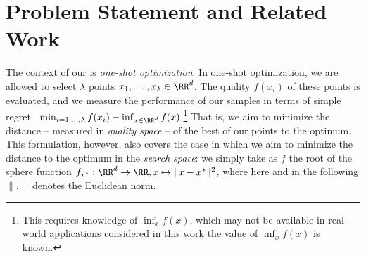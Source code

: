\section{Problem Statement and Related Work}\label{statement}
\label{sec:basics}
The context of our  is \textit{one-shot optimization}. In one-shot optimization, we are allowed to select $\lambda$ points $x_1, \ldots, x_{\lambda} \in \RR^d$. The quality $f(x_i)$ of these points is evaluated, and we measure the performance of our samples in terms of simple regret~\cite{bubeck2009pure} 
$\min_{i=1, \ldots,\lambda}f(x_i)-\inf_{x \in \RR^d} f(x)$.\footnote{This requires knowledge of $\inf_{x} f(x)$, which may not be available in real-world  applications considered in this work the value of $\inf_x f(x)$ is known.} That is, we aim to minimize the distance -- measured in \textit{quality space} -- of the best of our points to the optimum. This formulation, however, also covers the case in which we aim to minimize the distance to the optimum in the \textit{search space}: we simply take as $f$ the root of the sphere function $f_{x^*}: \RR^d \to \RR, x \mapsto \lVert x - x^*\rVert^2$, where here and in the following $\lVert .\rVert$ denotes the Euclidean norm. 
